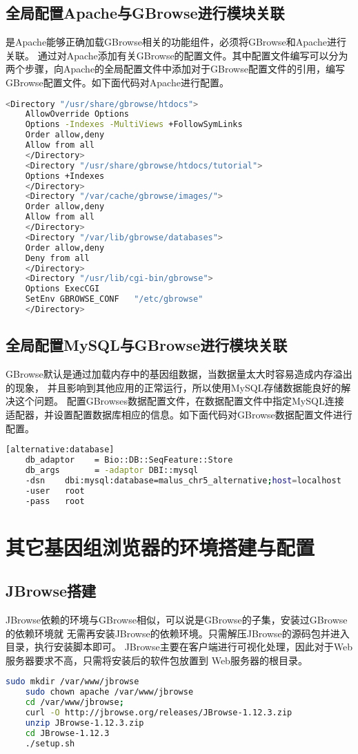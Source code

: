 	\subsection{全局配置Apache与GBrowse进行模块关联}
	是Apache能够正确加载GBrowse相关的功能组件，必须将GBrowse和Apache进行关联。
	通过对Apache添加有关GBrowse的配置文件。其中配置文件编写可以分为两个步骤，向Apache的全局配置文件中添加对于GBrowse配置文件的引用，编写GBrowse配置文件。如下面代码对Apache进行配置。
	\begin{lstlisting}[language=bash]
	<Directory "/usr/share/gbrowse/htdocs">
	AllowOverride Options
	Options -Indexes -MultiViews +FollowSymLinks
	Order allow,deny
	Allow from all
	</Directory>
	<Directory "/usr/share/gbrowse/htdocs/tutorial">
	Options +Indexes
	</Directory>
	<Directory "/var/cache/gbrowse/images/">
	Order allow,deny
	Allow from all
	</Directory>
	<Directory "/var/lib/gbrowse/databases">
	Order allow,deny
	Deny from all
	</Directory>
	<Directory "/usr/lib/cgi-bin/gbrowse">
	Options ExecCGI
	SetEnv GBROWSE_CONF   "/etc/gbrowse"
	</Directory>
	\end{lstlisting}
	\subsection{全局配置MySQL与GBrowse进行模块关联}
	GBrowse默认是通过加载内存中的基因组数据，当数据量太大时容易造成内存溢出的现象，
	并且影响到其他应用的正常运行，所以使用MySQL存储数据能良好的解决这个问题。
	配置GBrowses数据配置文件，在数据配置文件中指定MySQL连接适配器，并设置配置数据库相应的信息。如下面代码对GBrowse数据配置文件进行配置。
	\\
	\begin{lstlisting}[language=bash]
	[alternative:database]
	db_adaptor    = Bio::DB::SeqFeature::Store
	db_args       = -adaptor DBI::mysql
	-dsn    dbi:mysql:database=malus_chr5_alternative;host=localhost
	-user   root
	-pass   root
	\end{lstlisting}
	\section{其它基因组浏览器的环境搭建与配置}
	\subsection{JBrowse搭建}
	JBrowse依赖的环境与GBrowse相似，可以说是GBrowse的子集，安装过GBrowse的依赖环境就
	无需再安装JBrowse的依赖环境。只需解压JBrowse的源码包并进入目录，执行安装脚本即可。
	JBrowse主要在客户端进行可视化处理，因此对于Web服务器要求不高，只需将安装后的软件包放置到
	Web服务器的根目录。
	\begin{lstlisting}[language=bash]
	sudo mkdir /var/www/jbrowse 
	sudo chown apache /var/www/jbrowse
	cd /var/www/jbrowse;
	curl -O http://jbrowse.org/releases/JBrowse-1.12.3.zip
	unzip JBrowse-1.12.3.zip
	cd JBrowse-1.12.3
	./setup.sh
	\end{lstlisting}

